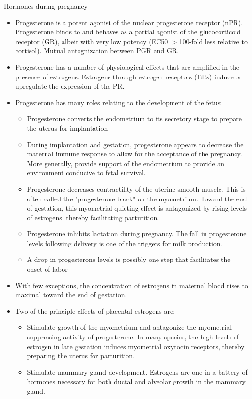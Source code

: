 \documentclass{report}
\begin{document}
Hormones during pregnancy 
\begin{itemize}
	\item Progesterone is a potent agonist of the nuclear progesterone receptor (nPR). Progesterone binds to and behaves as a partial agonist of the glucocorticoid receptor (GR), albeit with very low potency (EC50 $>$100-fold less relative to cortisol). Mutual antognization between PGR and GR.
	
	\item Progesterone has a number of physiological effects that are amplified in the presence of estrogens. Estrogens through estrogen receptors (ERs) induce or upregulate the expression of the PR.
	
	\item Progesterone has many roles relating to the development of the fetus: 
	\begin{itemize}
		\item Progesterone converts the endometrium to its secretory stage to prepare the uterus for implantation
		\item During implantation and gestation, progesterone appears to decrease the maternal immune response to allow for the acceptance of the pregnancy. More generally, provide support of the endometrium to provide an environment conducive to fetal survival.
		\item Progesterone decreases contractility of the uterine smooth muscle. This is often called the "progesterone block" on the myometrium. Toward the end of gestation, this myometrial-quieting effect is antagonized by rising levels of estrogens, thereby facilitating parturition.
		\item Progesterone inhibits lactation during pregnancy. The fall in progesterone levels following delivery is one of the triggers for milk production.
		\item A drop in progesterone levels is possibly one step that facilitates the onset of labor
	\end{itemize}
	
	\item With few exceptions, the concentration of estrogens in maternal blood rises to maximal toward the end of gestation. 
	
	\item Two of the principle effects of placental estrogens are:
	\begin{itemize}
		\item Stimulate growth of the myometrium and antagonize the myometrial-suppressing activity of progesterone. In many species, the high levels of estrogen in late gestation induces myometrial oxytocin receptors, thereby preparing the uterus for parturition.
		
		\item Stimulate mammary gland development. Estrogens are one in a battery of hormones necessary for both ductal and alveolar growth in the mammary gland.
	\end{itemize}
\end{itemize}
\end{document}
